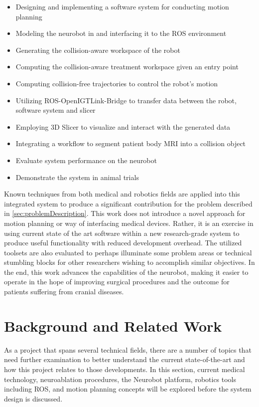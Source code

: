 \documentclass[12pt]{report}
\begin{document}
\begin{itemize}
\singlespacing
\item Designing and implementing a software system for conducting motion planning
\item Modeling the neurobot in and interfacing it to the ROS environment
\item Generating the collision-aware workspace of the robot
\item Computing the collision-aware treatment workspace given an entry point
\item Computing collision-free trajectories to control the robot's motion
\item Utilizing ROS-OpenIGTLink-Bridge to transfer data between the robot, software system and slicer
\item Employing 3D Slicer to visualize and interact with the generated data
\item Integrating a workflow to segment patient body MRI into a collision object
\item Evaluate system performance on the neurobot
\item Demonstrate the system in animal trials
\end{itemize}

Known techniques from both medical and robotics fields are applied into this integrated system to produce a significant contribution for the problem described in \autoref{sec:problemDescription}. This work does not introduce a novel approach for motion planning or way of interfacing medical devices. Rather, it is an exercise in using current state of the art software within a new research-grade system to produce useful functionality with reduced development overhead. The utilized toolsets are also evaluated to perhaps illuminate some problem areas or technical stumbling blocks for other researchers wishing to accomplish similar objectives. In the end, this work advances the capabilities of the neurobot, making it easier to operate in the hope of improving surgical procedures and the outcome for patients suffering from cranial diseases.


\chapter{Background and Related Work}
As a project that spans several technical fields, there are a number of topics that need further examination to better understand the current state-of-the-art and how this project relates to those developments. In this section, current medical technology, neuroablation procedures, the Neurobot platform, robotics tools including ROS, and motion planning concepts will be explored before the system design is discussed.
\end{document}

